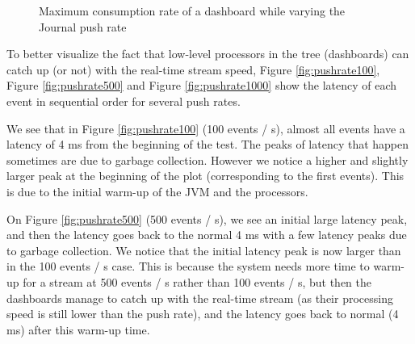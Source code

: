 \begin{figure}
  \begin{center} 
    \caption{Maximum consumption rate of a dashboard while varying the Journal push rate}
    \label{fig:latencyplot}
  \end{center}
\end{figure}


To better visualize the fact that low-level processors in the tree (dashboards) can catch up (or not) with the real-time stream speed, Figure \ref{fig:pushrate100}, Figure \ref{fig:pushrate500} and Figure \ref{fig:pushrate1000} show the latency of each event in sequential order for several push rates. 

We see that in Figure \ref{fig:pushrate100} (100 events / s), almost all events have a latency of 4 ms from the beginning of the test. The peaks of latency that happen sometimes are due to garbage collection. However we notice a higher and slightly larger peak at the beginning of the plot (corresponding to the first events). This is due to the initial warm-up of the JVM and the processors.

On Figure \ref{fig:pushrate500} (500 events / s), we see an initial large latency peak, and then the latency goes back to the normal 4 ms with a few latency peaks due to garbage collection. We notice that the initial latency peak is now larger than in the 100 events / s case. This is because the system needs more time to warm-up for a stream at 500 events / s rather than 100 events / s, but then the dashboards manage to catch up with the real-time stream (as their processing speed is still lower than the push rate), and the latency goes back to normal (4 ms) after this warm-up time.

